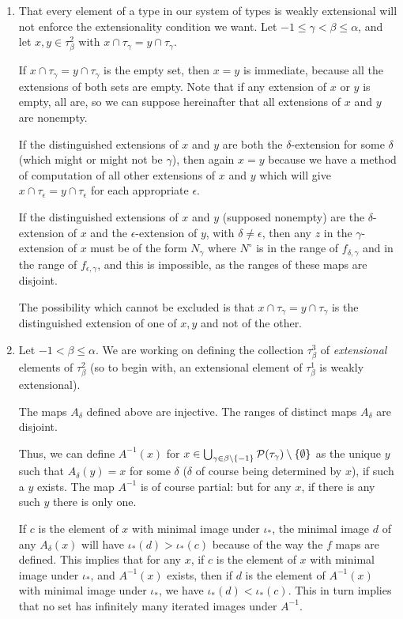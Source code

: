 \documentclass[12pt]{article}
\begin{document}
\begin{enumerate}
\item  That every element of a type in our system of types is weakly extensional will not enforce the extensionality condition we want.  Let $-1 \leq \gamma < \beta \leq \alpha$, and let
$x,y \in \tau^2_\beta$ with $x \cap \tau_\gamma = y \cap \tau_\gamma$.   

If $x \cap \tau_\gamma = y \cap \tau_\gamma$ is the empty set, then $x=y$ is immediate, because all the extensions of both sets are empty.  Note that if any extension
of $x$ or $y$ is empty, all are, so we can suppose hereinafter that all extensions of $x$ and $y$ are nonempty.

If the distinguished extensions of $x$ and $y$ are both the $\delta$-extension for some $\delta$ (which might or might not be $\gamma$), then again $x=y$ because we have a method of computation of all other extensions of $x$ and $y$ which will give $x \cap \tau_\epsilon = y \cap \tau_\epsilon$ for each appropriate $\epsilon$. 

If the distinguished extensions of $x$ and $y$ (supposed nonempty) are the $\delta$-extension of $x$ and the $\epsilon$-extension of $y$, with $\delta \neq \epsilon$, then any $z$ in the $\gamma$-extension of $x$ must be of the form $N_\gamma$ where $N^\circ$ is in the range of $f_{\delta,\gamma}$ and in the range of $f_{\epsilon,\gamma}$, and this is impossible, as the ranges of these maps are disjoint.

The possibility which cannot be excluded is that $x \cap \tau_\gamma = y \cap \tau_\gamma$ is the distinguished extension of one of $x,y$ and not of the other.

\item  Let $-1 < \beta \leq \alpha$.  We are working on defining the collection $\tau_\beta^3$ of {\em extensional\/} elements of $\tau^2_\beta$ (so to begin with,
an extensional element of $\tau^1_\beta$ is weakly extensional).

The maps $A_\delta$ defined above are injective.  The ranges of distinct maps $A_\delta$ are disjoint.  

Thus, we can define $A^{-1}(x)$ for $x \in \bigcup_{\gamma \in \beta\setminus \{-1\}} {\cal P} (\tau_\gamma) \setminus \{\emptyset\}$ as the unique $y$ such that $A_{\delta}(y)=x$ for some $\delta$ ($\delta$ of course being determined by $x$), if such a $y$ exists.  The map $A^{-1}$ is of course partial:  but for any $x$, if there is any such $y$ there is only one.

If $c$ is the element of $x$ with minimal image under $\iota_*$, the minimal image $d$ of any $A_\delta(x)$ will have $\iota_*(d) > \iota_*(c)$ because
of the way the $f$ maps are defined.  This implies that for any $x$, if $c$ is the element of $x$ with minimal image under $\iota_*$, and $A^{-1}(x)$ exists, then if
$d$ is the element of $A^{-1}(x)$ with minimal image under $\iota_*$, we have $\iota_*(d) < \iota_*(c)$.  This in turn implies that no set has infinitely many iterated images
under $A^{-1}$.


\end{enumerate}
\end{document}
